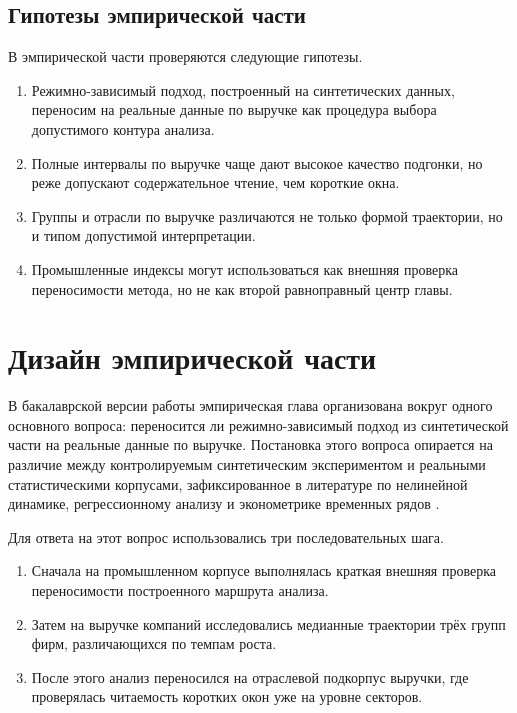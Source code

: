 \subsection{Гипотезы эмпирической части}
\label{sec:gipotezy-empiricheskoi-chasti}

В эмпирической части проверяются следующие гипотезы.

\begin{enumerate}
\def\labelenumi{\arabic{enumi}.}
\tightlist
\item
  Режимно-зависимый подход, построенный на синтетических данных, переносим на реальные данные по выручке как процедура выбора допустимого контура анализа.
\item
  Полные интервалы по выручке чаще дают высокое качество подгонки, но реже допускают содержательное чтение, чем короткие окна.
\item
  Группы и отрасли по выручке различаются не только формой траектории, но и типом допустимой интерпретации.
\item
  Промышленные индексы могут использоваться как внешняя проверка переносимости метода, но не как второй равноправный центр главы.
\end{enumerate}

\section{Дизайн эмпирической части}
\label{sec:dizain-empiricheskoi-chasti}

В бакалаврской версии работы эмпирическая глава организована вокруг одного основного вопроса: переносится ли режимно-зависимый подход из синтетической части на реальные данные по выручке. Постановка этого вопроса опирается на различие между контролируемым синтетическим экспериментом и реальными статистическими корпусами, зафиксированное в литературе по нелинейной динамике, регрессионному анализу и эконометрике временных рядов \cite{strogatz,montgomery,hamilton,box-jenkins}.

Для ответа на этот вопрос использовались три последовательных шага.

\begin{enumerate}
\def\labelenumi{\arabic{enumi}.}
\tightlist
\item
  Сначала на промышленном корпусе выполнялась краткая внешняя проверка переносимости построенного маршрута анализа.
\item
  Затем на выручке компаний исследовались медианные траектории трёх групп фирм, различающихся по темпам роста.
\item
  После этого анализ переносился на отраслевой подкорпус выручки, где проверялась читаемость коротких окон уже на уровне секторов.
\end{enumerate}

